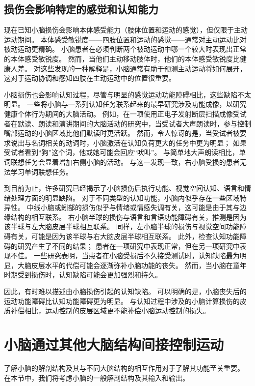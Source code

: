 \subsection{损伤会影响特定的感觉和认知能力}

现在已知小脑损伤会影响本体感受能力（肢体位置和运动的感觉），但仅限于主动运动期间。
本体感受敏锐度——四肢位置和运动的感觉——通常对主动运动比对被动运动更精确。
小脑患者在必须判断两个被动运动中哪一个较大时表现出正常的本体感受敏锐度。
然而，当他们主动移动肢体时，他们的本体感受敏锐度比健康人差。
对这些发现的一种解释是，小脑通常有助于预测主动运动将如何展开，这对于运动协调和感知四肢在主动运动中的位置很重要。


小脑损伤也会影响认知过程，尽管与明显的感觉运动功能障碍相比，这些缺陷不太明显。
一些将小脑与一系列认知任务联系起来的最早研究涉及功能成像，以研究健康个体行为期间的大脑活动。
例如，在一项使用正电子发射断层扫描成像受试者在默读、朗读和演讲期间的大脑活动的研究中，当受试者大声朗读时，参与控制嘴部运动的小脑区域比他们默读时更活跃。
然而，令人惊讶的是，当受试者被要求说出与名词相关的动词时，小脑激活在认知负荷更大的任务中更为明显；
如果受试者看到“狗”这个词，他或她可能会回应“吠叫”。
与简单地大声朗读相比，单词联想任务会显着增加右侧小脑的活动。
与这一发现一致，右小脑受损的患者无法学习单词联想任务。


到目前为止，许多研究已经揭示了小脑损伤后执行功能、视觉空间认知、语言和情绪处理方面的明显缺陷。
对于不同类型的认知功能，小脑内似乎存在一些区域特异性。
中线小脑或蚓部的损伤似乎与情绪或情感失调有关，这可能是由于其与边缘结构的相互联系。
右小脑半球的损伤与语言和言语功能障碍有关，推测是因为该半球与左大脑皮层半球相互联系。
同样，左小脑半球的损伤与视觉空间功能障碍有关，可能是因为该半球与右大脑皮层半球相互联系。
此外，检查认知功能障碍的研究产生了不同的结果；
患者在一项研究中表现正常，但在另一项研究中表现不佳。
一些研究表明，当患者在小脑受损后不久接受测试时，认知缺陷最为明显，大脑皮层水平的代偿可能会逐渐弥补小脑功能的丧失。
然而，当小脑在童年时期受到损伤时，认知缺陷可能会更加强烈和持久。


因此，有时难以描述由小脑损伤引起的认知缺陷。
可以明确的是，小脑丧失后的运动功能障碍比认知功能障碍更为明显。
与认知过程中涉及的小脑计算损伤的皮质补偿相比，运动控制的皮层区域更不能补偿小脑运动控制的损失。



\section{小脑通过其他大脑结构间接控制运动}

了解小脑的解剖结构及其与不同大脑结构的相互作用对于了解其功能至关重要。
在本节中，我们将考虑小脑的一般解剖结构及其输入和输出。


